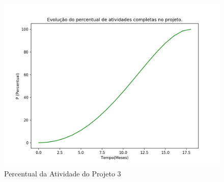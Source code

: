 \documentclass[14pt, oneside]{book}
\theoremstyle{definition}
\begin{document}
            \begin{figure}[H]
                \centering
                \includegraphics[scale=0.9]{empresa3_p.png}
                \caption{Percentual da Atividade do Projeto 3}
                \label{empresa3_p}
            \end{figure}
            
\end{document}
